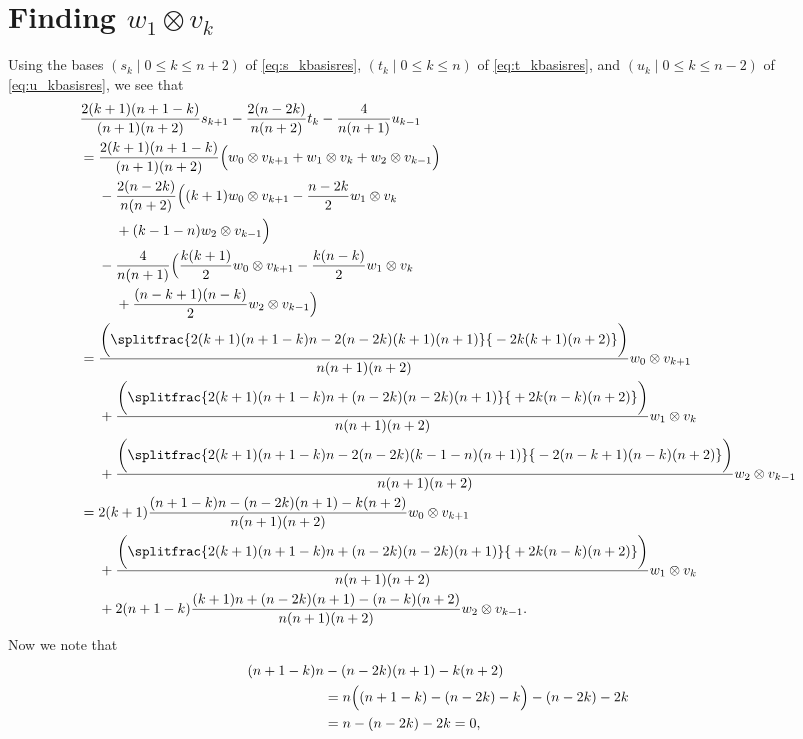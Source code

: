 \section{\texorpdfstring{Finding $w_1\otimes v_k$}{Finding w\_1 tensor v\_k}}\label{sec:w_1tensorv_k}
Using the bases $(s_k \mid 0\leq k\leq n+2)$ of \cref{eq:s_kbasisres}, $(t_k \mid 0\leq k\leq n)$ of \cref{eq:t_kbasisres}, and $(u_k \mid 0\leq k\leq n-2)$ of \cref{eq:u_kbasisres}, we see that
\begin{align*}
  &\dfrac{2(k+1)(n+1-k)}{(n+1)(n+2)}s_{k+1} - \dfrac{2(n-2k)}{n(n+2)}t_k - \dfrac{4}{n(n+1)}u_{k-1}\\
                                   &= \dfrac{2(k+1)(n+1-k)}{(n+1)(n+2)}\Bigl( w_0\otimes v_{k+1} + w_1\otimes v_{k} + w_2\otimes v_{k-1} \Bigr) \\*
                                   &\phantom{{}={}}{} - \dfrac{2(n-2k)}{n(n+2)}\Bigl( (k+1)w_0\otimes v_{k+1} - \dfrac{n-2k}{2}w_1\otimes v_k \\*
                                   &\phantom{{}={}-{}}{} + (k-1-n)w_2\otimes v_{k-1} \Bigr) \\*
                                   &\phantom{{}={}}{} - \dfrac{4}{n(n+1)}\Bigl( \dfrac{k(k+1)}{2}w_0\otimes v_{k+1} - \dfrac{k(n-k)}{2}w_1\otimes v_k \\*
                                   &\phantom{{}={}+{}}{}+ \dfrac{(n-k+1)(n-k)}{2}w_2\otimes v_{k-1} \Bigr) \\
  &= \dfrac{
    \biggl(\splitfrac{2(k+1)(n+1-k)n-2(n-2k)(k+1)(n+1)}{{}-2k(k+1)(n+2)}\biggr)
    }{n(n+1)(n+2)}w_0\otimes v_{k+1} \\*
  &\phantom{{}={}}{} + \dfrac{
    \biggl(\splitfrac{2(k+1)(n+1-k)n+(n-2k)(n-2k)(n+1)}{{}+2k(n-k)(n+2)}\biggr)
    }
    {n(n+1)(n+2)}w_1\otimes v_k \\*
  &\phantom{{}={}}{} + \dfrac{
    \biggl(\splitfrac{2(k+1)(n+1-k)n-2(n-2k)(k-1-n)(n+1)}{{}-2(n-k+1)(n-k)(n+2)}\biggr)
    }
    {n(n+1)(n+2)}w_2\otimes v_{k-1} \\
  &= 2(k+1)\dfrac{
    (n+1-k)n-(n-2k)(n+1)-k(n+2)
    }
    {n(n+1)(n+2)}w_0\otimes v_{k+1} \\*
  &\phantom{{}={}}{} + \dfrac{
    \biggl(\splitfrac{2(k+1)(n+1-k)n+(n-2k)(n-2k)(n+1)}{{}+2k(n-k)(n+2)}\biggr)
    }
    {n(n+1)(n+2)}w_1\otimes v_k \\*
  &\phantom{{}={}}{} + 2(n+1-k)\dfrac{
    (k+1)n + (n-2k)(n+1) - (n-k)(n+2)
    }
    {n(n+1)(n+2)}w_2\otimes v_{k-1}.
\end{align*}
Now we note that
\begin{align*}
  (n+1-k)n&-(n-2k)(n+1)-k(n+2) \\
          &= n\Bigl( (n+1-k)-(n-2k)-k \Bigr)-(n-2k)-2k \\
          &= n-(n-2k)-2k = 0,
\end{align*}
